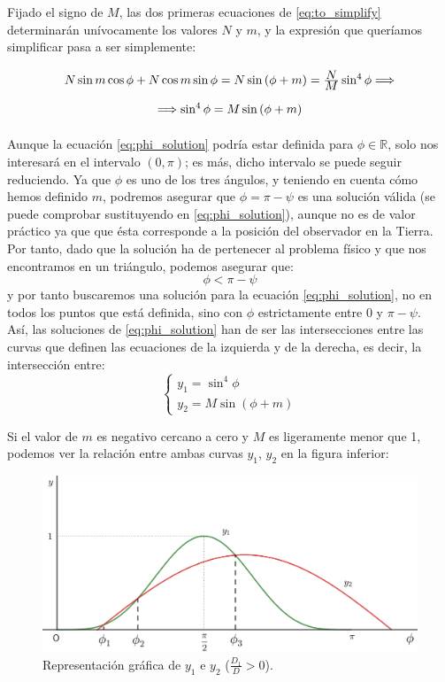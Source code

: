 \documentclass[11pt]{book}
\newcommand\ddfrac[2]{\frac{\displaystyle #1}{\displaystyle #2}}
\begin{document}
Fijado el signo de $M$, las dos primeras ecuaciones de \eqref{eq:to_simplify} determinarán unívocamente los valores $N$ y $m$, y la expresión que queríamos simplificar pasa a ser simplemente:
\begin{align}
\def\arraystretch{2}
\begin{array}{c}
	N\sin{m}\cos{\phi}+N\cos{m}\sin{\phi}=N\sin{(\phi+m)}=\ddfrac{N}{M}\sin^4{\phi} \Longrightarrow\\
	\Longrightarrow\sin^4{\phi}=M\sin{(\phi+m)}
\end{array}
\label{eq:phi_solution}
\end{align}

Aunque la ecuación \eqref{eq:phi_solution} podría estar definida para $\phi\in\mathbb{R}$, solo nos interesará en el intervalo $(0,\pi)$; es más, dicho intervalo se puede seguir reduciendo. Ya que $\phi$ es uno de los tres ángulos, y teniendo en cuenta cómo hemos definido $m$, podremos asegurar que $\phi=\pi-\psi$ es una solución válida (se puede comprobar sustituyendo en \eqref{eq:phi_solution}), aunque no es de valor práctico ya que que ésta corresponde a la posición del observador en la Tierra. Por tanto, dado que la solución ha de pertenecer al problema físico y que nos encontramos en un triángulo, podemos asegurar que:
\[
\phi<\pi-\psi
\]
\noindent y por tanto buscaremos una solución para la ecuación \eqref{eq:phi_solution}, no en todos los puntos que está definida, sino con $\phi$ estrictamente entre 0 y $\pi-\psi$.\\

Así, las soluciones de \eqref{eq:phi_solution} han de ser las intersecciones entre las curvas que definen las ecuaciones de la izquierda y de la derecha, es decir, la intersección entre:
\[
\left\{
\begin{array}{l}
	y_1=\sin^4{\phi}\\
	y_2=M\sin{(\phi+m)}
\end{array}
\right.
\]

Si el valor de $m$ es negativo cercano a cero y $M$ es ligeramente menor que 1, podemos ver la relación entre ambas curvas $y_1$, $y_2$ en la figura inferior:

\begin{figure}[H]
\centering
\includegraphics[scale=0.125]{images/phi_solution_m_negative_M_near_1.png}
\caption{Representación gráfica de $y_1$ e $y_2$ ($\frac{D_1}{D}>0$).}
\label{fig:phi_solution_m_negative_M_near_1}
\end{figure}
\end{document}
